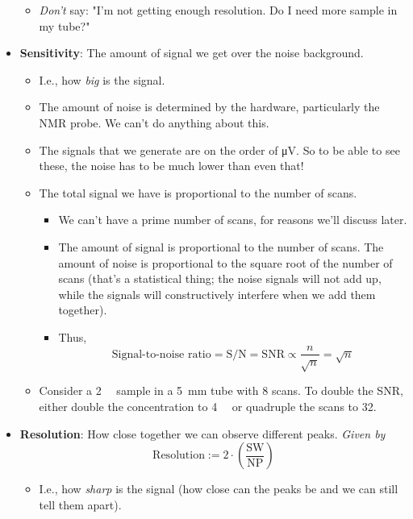 \documentclass[../notes.tex]{subfiles}
\begin{document}
\begin{itemize}
\begin{itemize}
        \item \emph{Don't} say: "I'm not getting enough resolution. Do I need more sample in my tube?"
    \end{itemize}
    \item \textbf{Sensitivity}: The amount of signal we get over the noise background.
    \begin{itemize}
        \item I.e., how \emph{big} is the signal.
        \item The amount of noise is determined by the hardware, particularly the NMR probe. We can't do anything about this.
        \item The signals that we generate are on the order of \si{\micro\volt}. So to be able to see these, the noise has to be much lower than even that!
        \item The total signal we have is proportional to the number of scans.
        \begin{itemize}
            \item We can't have a prime number of scans, for reasons we'll discuss later.
            \item The amount of signal is proportional to the number of scans. The amount of noise is proportional to the square root of the number of scans (that's a statistical thing; the noise signals will not add up, while the signals will constructively interfere when we add them together).
            \item Thus,
            \begin{equation*}
                \text{Signal-to-noise ratio} = \text{S/N} = \text{SNR} \propto \frac{n}{\sqrt{n}} = \sqrt{n}
            \end{equation*}
        \end{itemize}
        \item Consider a \SI{2}{\milli\molar} sample in a \SI{5}{\milli\meter} tube with 8 scans. To double the SNR, either double the concentration to \SI{4}{\milli\molar} or quadruple the scans to 32.
    \end{itemize}
    \item \textbf{Resolution}: How close together we can observe different peaks. \emph{Given by}
    \begin{equation*}
        \text{Resolution} := 2\cdot\left( \frac{\text{SW}}{\text{NP}} \right)
    \end{equation*}
    \begin{itemize}
        \item I.e., how \emph{sharp} is the signal (how close can the peaks be and we can still tell them apart).

\end{itemize}
\end{itemize}
\end{document}
